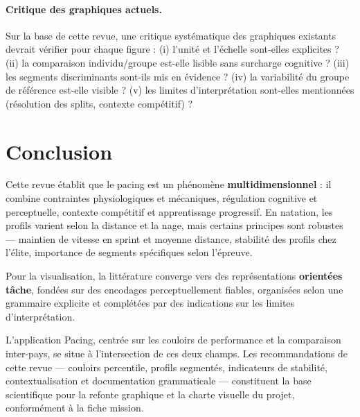 \documentclass[11pt,a4paper]{article}
\begin{document}
\paragraph{Critique des graphiques actuels.}
Sur la base de cette revue, une critique systématique des graphiques existants devrait vérifier pour chaque figure : (i) l'unité et l'échelle sont-elles explicites ? (ii) la comparaison individu/groupe est-elle lisible sans surcharge cognitive ? (iii) les segments discriminants sont-ils mis en évidence ? (iv) la variabilité du groupe de référence est-elle visible ? (v) les limites d'interprétation sont-elles mentionnées (résolution des splits, contexte compétitif) ?

\section{Conclusion}

Cette revue établit que le pacing est un phénomène \textbf{multidimensionnel} : il combine contraintes physiologiques et mécaniques, régulation cognitive et perceptuelle, contexte compétitif et apprentissage progressif. En natation, les profils varient selon la distance et la nage, mais certains principes sont robustes --- maintien de vitesse en sprint et moyenne distance, stabilité des profils chez l'élite, importance de segments spécifiques selon l'épreuve.

Pour la visualisation, la littérature converge vers des représentations \textbf{orientées tâche}, fondées sur des encodages perceptuellement fiables, organisées selon une grammaire explicite et complétées par des indications sur les limites d'interprétation.

L'application Pacing, centrée sur les couloirs de performance et la comparaison inter-pays, se situe à l'intersection de ces deux champs. Les recommandations de cette revue --- couloirs percentile, profils segmentés, indicateurs de stabilité, contextualisation et documentation grammaticale --- constituent la base scientifique pour la refonte graphique et la charte visuelle du projet, conformément à la fiche mission.
\end{document}
